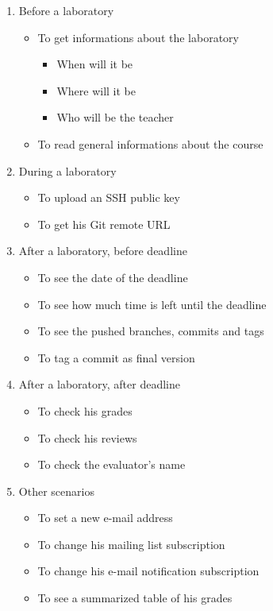 \begin{enumerate}
	\item Before a laboratory
	\begin{itemize}
		\item To get informations about the laboratory
		\begin{itemize}
			\item When will it be
			\item Where will it be
			\item Who will be the teacher
		\end{itemize}
		\item To read general informations about the course
	\end{itemize}
	
	\item During a laboratory
	\begin{itemize}
		\item To upload an SSH public key
		\item To get his Git remote URL
	\end{itemize}
	
	\item After a laboratory, before deadline
	\begin{itemize}
		\item To see the date of the deadline
		\item To see how much time is left until the deadline
		\item To see the pushed branches, commits and tags
		\item To tag a commit as final version
	\end{itemize}
	
	\item After a laboratory, after deadline
	\begin{itemize}
		\item To check his grades
		\item To check his reviews
		\item To check the evaluator's name
	\end{itemize}
	
	\item Other scenarios
	\begin{itemize}
		\item To set a new e-mail address
		\item To change his mailing list subscription
		\item To change his e-mail notification subscription
		\item To see a summarized table of his grades
	\end{itemize}
	
\end{enumerate}

